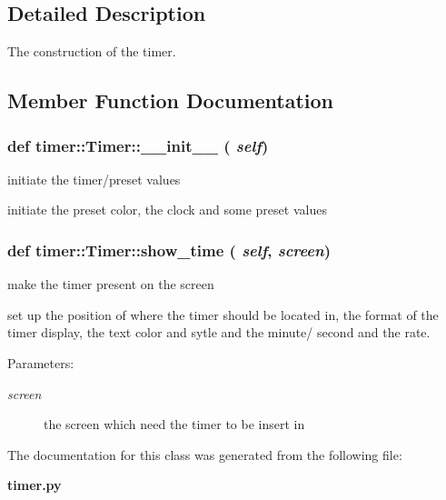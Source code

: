 \subsection{Detailed Description}
The construction of the timer. 



\subsection{Member Function Documentation}
\subsubsection{\setlength{\rightskip}{0pt plus 5cm}def timer::Timer::\_\-\_\-init\_\-\_\- ( {\em self})}\label{classtimer_1_1Timer_2f17a23be98e8636dbf11a6c801aa650}


initiate the timer/preset values 

initiate the preset color, the clock and some preset values 
\subsubsection{\setlength{\rightskip}{0pt plus 5cm}def timer::Timer::show\_\-time ( {\em self},  {\em screen})}\label{classtimer_1_1Timer_487f2e9b62fcfa123b28ce8a075b20d5}


make the timer present on the screen 

set up the position of where the timer should be located in, the format of the timer display, the text color and sytle and the minute/ second and the rate. \begin{Desc}
\item[Parameters:]
\begin{description}
\item[{\em screen}]the screen which need the timer to be insert in \end{description}
\end{Desc}


The documentation for this class was generated from the following file:\begin{CompactItemize}
\item 
\bf{timer.py}\end{CompactItemize}
